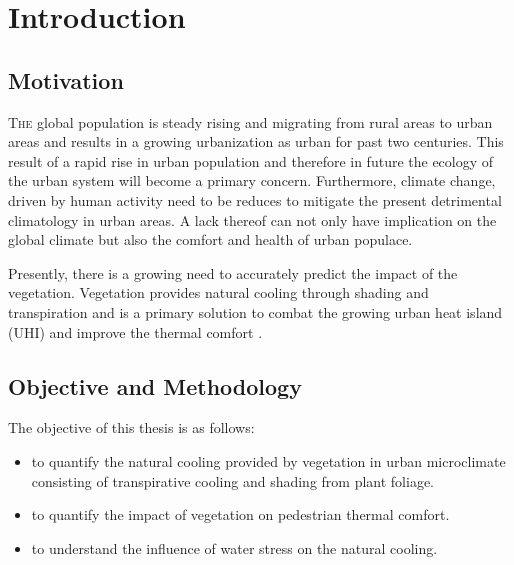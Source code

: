 \chapter{Introduction}
\label{ch:introduction}

\def\figdir{chapters/introduction/figures/}


%		

\section{Motivation}

\lettrine[lines=3,nindent=0em,loversize=0.1]{T}{he} global population is steady rising and migrating from rural areas to urban areas and results in a growing urbanization as urban for past two centuries. This result of a rapid rise in urban population and therefore in future the ecology of the urban system will become a primary concern. Furthermore, climate change, driven by human activity need to be reduces to mitigate the present detrimental climatology in urban areas. A lack thereof can not only have implication on the global climate but also the comfort and health of urban populace. 

Presently, there is a growing need to accurately predict the impact of the vegetation. Vegetation provides natural cooling through shading and transpiration and is a primary solution to combat the growing urban heat island (UHI) and improve the thermal comfort  \citep{Gillner2015, Bowler2010, Loughner2012}. 


\section{Objective and Methodology}

The objective of this thesis is as follows:
\begin{itemize}
	\item to quantify the natural cooling provided by vegetation in urban microclimate consisting of transpirative cooling and shading from plant foliage.
	\item to quantify the impact of vegetation on pedestrian thermal comfort. 
	\item to understand the influence of water stress on the natural cooling.
\end{itemize}

